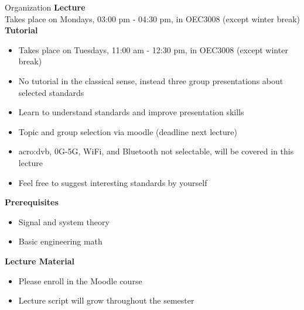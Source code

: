 \begin{frame}{Organization}
  \textbf{Lecture}\\
  Takes place on Mondays, 03:00 pm - 04:30 pm, in OEC3008 (except winter break)\\\vspace{1.5ex}
  \textbf{Tutorial}
  \begin{itemize}
    \item Takes place on Tuesdays, 11:00 am - 12:30 pm, in OEC3008 (except winter break)
    \item No tutorial in the classical sense, instead three group presentations about selected standards
    \item Learn to understand standards and improve presentation skills
    \item Topic and group selection via moodle (deadline next lecture)
    \item \Gls{acro:dvb}, 0G-5G, WiFi, and Bluetooth not selectable, will be covered in this lecture
    \item Feel free to suggest interesting standards by yourself
  \end{itemize}
  \textbf{Prerequisites}
  \begin{itemize}
    \item Signal and system theory
    \item Basic engineering math
  \end{itemize}
  \textbf{Lecture Material}
  \begin{itemize}
    \item Please enroll in the Moodle course
    \item Lecture script will grow throughout the semester
  \end{itemize}
\end{frame}

